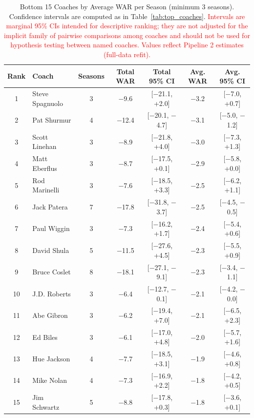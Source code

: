 \documentclass[USenglish]{article}
\newcommand{\rev}[1]{\textcolor{red}{#1}}
\theoremstyle{dgthm}
\theoremstyle{dgdef}
\begin{document}
\begin{table}[!ht]
\caption{Bottom 15 Coaches by Average WAR per Season (minimum 3 seasons). Confidence intervals are computed as in Table~\ref{tab:top_coaches}. \rev{Intervals are marginal 95\% CIs intended for descriptive ranking; they are not adjusted for the implicit family of pairwise comparisons among coaches and should not be used for hypothesis testing between named coaches. Values reflect Pipeline 2 estimates (full-data refit).}}
\label{tab:bottom_coaches}
\small
\begin{tabular}{clccccc}
\toprule
Rank & Coach & Seasons & Total WAR & Total 95\% CI & Avg. WAR & Avg. 95\% CI \\
\midrule
1 & Steve Spagnuolo & 3 & $-$9.6 & [$-$21.1, +2.0] & $-$3.2 & [$-$7.0, +0.7] \\
2 & Pat Shurmur & 4 & $-$12.4 & [$-$20.1, $-$4.7] & $-$3.1 & [$-$5.0, $-$1.2] \\
3 & Scott Linehan & 3 & $-$8.9 & [$-$21.8, +4.0] & $-$3.0 & [$-$7.3, +1.3] \\
4 & Matt Eberflus & 3 & $-$8.7 & [$-$17.5, +0.1] & $-$2.9 & [$-$5.8, +0.0] \\
5 & Rod Marinelli & 3 & $-$7.6 & [$-$18.5, +3.3] & $-$2.5 & [$-$6.2, +1.1] \\
6 & Jack Patera & 7 & $-$17.8 & [$-$31.8, $-$3.7] & $-$2.5 & [$-$4.5, $-$0.5] \\
7 & Paul Wiggin & 3 & $-$7.3 & [$-$16.2, +1.7] & $-$2.4 & [$-$5.4, +0.6] \\
8 & David Shula & 5 & $-$11.5 & [$-$27.6, +4.5] & $-$2.3 & [$-$5.5, +0.9] \\
9 & Bruce Coslet & 8 & $-$18.1 & [$-$27.1, $-$9.1] & $-$2.3 & [$-$3.4, $-$1.1] \\
10 & J.D. Roberts & 3 & $-$6.4 & [$-$12.7, $-$0.1] & $-$2.1 & [$-$4.2, $-$0.0] \\
11 & Abe Gibron & 3 & $-$6.2 & [$-$19.4, +7.0] & $-$2.1 & [$-$6.5, +2.3] \\
12 & Ed Biles & 3 & $-$6.1 & [$-$17.0, +4.8] & $-$2.0 & [$-$5.7, +1.6] \\
13 & Hue Jackson & 4 & $-$7.7 & [$-$18.5, +3.1] & $-$1.9 & [$-$4.6, +0.8] \\
14 & Mike Nolan & 4 & $-$7.3 & [$-$16.9, +2.2] & $-$1.8 & [$-$4.2, +0.5] \\
15 & Jim Schwartz & 5 & $-$8.8 & [$-$17.8, +0.3] & $-$1.8 & [$-$3.6, +0.1] \\
\bottomrule
\end{tabular}
\end{table}
\end{document}
